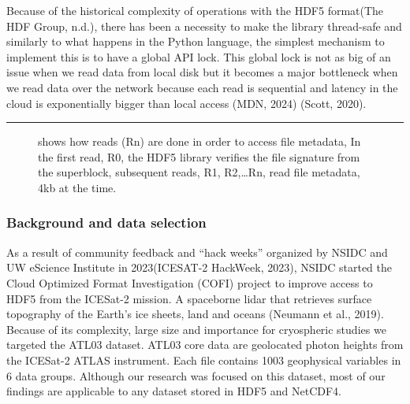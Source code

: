 \documentclass[
]{agujournal2019}
\begin{document}
Because of the historical complexity of operations with the HDF5
format(The HDF Group, n.d.), there has been a necessity to make the
library thread-safe and similarly to what happens in the Python
language, the simplest mechanism to implement this is to have a global
API lock. This global lock is not as big of an issue when we read data
from local disk but it becomes a major bottleneck when we read data over
the network because each read is sequential and latency in the cloud is
exponentially bigger than local access (MDN, 2024) (Scott, 2020).

\begin{center}\rule{0.5\linewidth}{0.5pt}\end{center}

\begin{figure}


\caption{\label{fig-1}shows how reads (Rn) are done in order to access
file metadata, In the first read, R0, the HDF5 library verifies the file
signature from the superblock, subsequent reads, R1, R2,\ldots Rn, read
file metadata, 4kb at the time.}

\end{figure}%

\subsubsection{\texorpdfstring{\textbf{Background and data
selection}}{Background and data selection}}\label{background-and-data-selection}

As a result of community feedback and ``hack weeks'' organized by NSIDC
and UW eScience Institute in 2023(ICESAT-2 HackWeek, 2023), NSIDC
started the Cloud Optimized Format Investigation (COFI) project to
improve access to HDF5 from the ICESat-2 mission. A spaceborne lidar
that retrieves surface topography of the Earth's ice sheets, land and
oceans (Neumann et al., 2019). Because of its complexity, large size and
importance for cryospheric studies we targeted the ATL03 dataset. ATL03
core data are geolocated photon heights from the ICESat-2 ATLAS
instrument. Each file contains 1003 geophysical variables in 6 data
groups. Although our research was focused on this dataset, most of our
findings are applicable to any dataset stored in HDF5 and NetCDF4.
\end{document}
